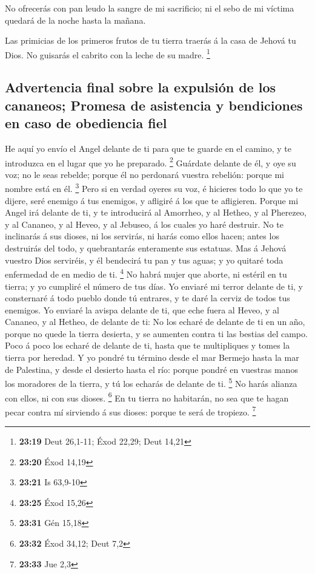  No ofrecerás con pan leudo la sangre de mi sacrificio; ni
el sebo de mi víctima quedará de la noche hasta la mañana.

 Las primicias de los primeros frutos de tu tierra traerás
á la casa de Jehová tu Dios. No guisarás el cabrito con la leche de su
madre. \footnote{\textbf{23:19} Deut 26,1-11; Éxod 22,29; Deut 14,21}

\hypertarget{advertencia-final-sobre-la-expulsiuxf3n-de-los-cananeos-promesa-de-asistencia-y-bendiciones-en-caso-de-obediencia-fiel}{%
\subsection{Advertencia final sobre la expulsión de los cananeos;
Promesa de asistencia y bendiciones en caso de obediencia
fiel}\label{advertencia-final-sobre-la-expulsiuxf3n-de-los-cananeos-promesa-de-asistencia-y-bendiciones-en-caso-de-obediencia-fiel}}

 He aquí yo envío el Angel delante de ti para que te guarde
en el camino, y te introduzca en el lugar que yo he preparado.
\footnote{\textbf{23:20} Éxod 14,19}  Guárdate delante de
él, y oye su voz; no le seas rebelde; porque él no perdonará vuestra
rebelión: porque mi nombre está en él. \footnote{\textbf{23:21} Is
  63,9-10}  Pero si en verdad oyeres su voz, é hicieres
todo lo que yo te dijere, seré enemigo á tus enemigos, y afligiré á los
que te afligieren.  Porque mi Angel irá delante de ti, y te
introducirá al Amorrheo, y al Hetheo, y al Pherezeo, y al Cananeo, y al
Heveo, y al Jebuseo, á los cuales yo haré destruir.  No te
inclinarás á sus dioses, ni los servirás, ni harás como ellos hacen;
antes los destruirás del todo, y quebrantarás enteramente sus estatuas.
 Mas á Jehová vuestro Dios serviréis, y él bendecirá tu pan
y tus aguas; y yo quitaré toda enfermedad de en medio de ti. \footnote{\textbf{23:25}
  Éxod 15,26}  No habrá mujer que aborte, ni estéril en tu
tierra; y yo cumpliré el número de tus días.  Yo enviaré mi
terror delante de ti, y consternaré á todo pueblo donde tú entrares, y
te daré la cerviz de todos tus enemigos.  Yo enviaré la
avispa delante de ti, que eche fuera al Heveo, y al Cananeo, y al
Hetheo, de delante de ti:  No los echaré de delante de ti
en un año, porque no quede la tierra desierta, y se aumenten contra ti
las bestias del campo.  Poco á poco los echaré de delante
de ti, hasta que te multipliques y tomes la tierra por heredad.
 Y yo pondré tu término desde el mar Bermejo hasta la mar
de Palestina, y desde el desierto hasta el río: porque pondré en
vuestras manos los moradores de la tierra, y tú los echarás de delante
de ti. \footnote{\textbf{23:31} Gén 15,18}  No harás
alianza con ellos, ni con sus dioses. \footnote{\textbf{23:32} Éxod
  34,12; Deut 7,2}  En tu tierra no habitarán, no sea que
te hagan pecar contra mí sirviendo á sus dioses: porque te será de
tropiezo. \footnote{\textbf{23:33} Jue 2,3}

